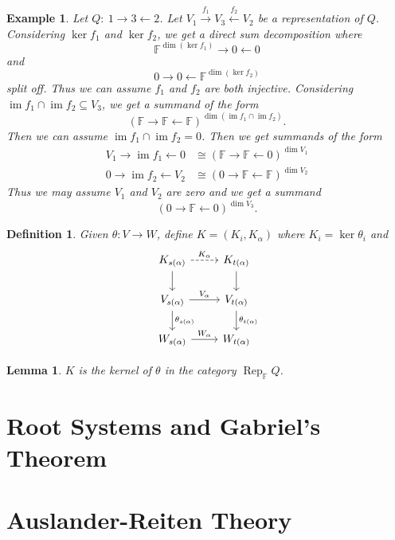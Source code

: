 \documentclass{book}
\newtheorem{lemma}[theorem]{Lemma}
\newtheorem{definition}[theorem]{Definition}
\newtheorem{example}{Example}[section]
\DeclareMathOperator{\Rep}{Rep}
\DeclareMathOperator{\im}{im}
\begin{document}
		\begin{example}
			Let $Q: \ 1\to3\leftarrow 2$. Let $V_1 \xrightarrow{f_1} V_3 \xleftarrow{f_2} V_2$ be a representation of $Q$. Considering $\ker f_1$ and $\ker f_2$, we get a direct sum decomposition where  $$\mathbb{F}^{\dim(\ker f_1)} \rightarrow 0 \leftarrow 0$$ and $$ 0\rightarrow 0 \leftarrow \mathbb{F}^{\dim(\ker f_2)}$$ split off. Thus we can assume $f_1$ and $f_2$ are both injective. Considering $\im f_1\cap \im f_2 \subseteq V_3$, we get a summand of the form \[(\mathbb{F}\rightarrow\mathbb{F}\leftarrow\mathbb{F})^{\dim(\im f_1\cap \im f_2)}.\] Then we can assume $\im f_1\cap \im f_2=0$. Then we get summands of the form 
			\begin{align*} V_1\rightarrow\im f_1 \leftarrow 0 &\cong (\mathbb{F}\rightarrow\mathbb{F}\leftarrow 0)^{\dim V_1} \\ 0\rightarrow\im f_2 \leftarrow V_2 &\cong (0 \rightarrow\mathbb{F}\leftarrow\mathbb{F})^{\dim V_2} \end{align*}
			Thus we may assume $V_1$ and $V_2$ are zero and we get a summand \[(0 \rightarrow\mathbb{F}\leftarrow0)^{\dim V_3}. \]
		\end{example}
		
		\begin{definition}
			Given $\theta:V\to W$, define $K=(K_i,K_\alpha)$ where $K_i=\ker\theta_i$ and \[ \begin{tikzcd}
		K_{s(\alpha)} \arrow[dashed]{r}{K_\alpha} \arrow{d} & K_{t(\alpha)} \arrow{d}\\
		V_{s(\alpha)} \arrow{r}{V_\alpha} \arrow{d}{\theta_{s(\alpha)}} & V_{t(\alpha)} \arrow{d}{\theta_{t(\alpha)}}\\
		W_{s(\alpha)} \arrow{r}{W_\alpha}& W_{t(\alpha)}
		\end{tikzcd}\]
		\end{definition}
		
		\begin{lemma}
			$K$ is the kernel of $\theta$ in the category $\Rep_\mathbb{F}Q$.
		\end{lemma}

  \section{Root Systems and Gabriel's Theorem}

  \section{Auslander-Reiten Theory}
\end{document}
